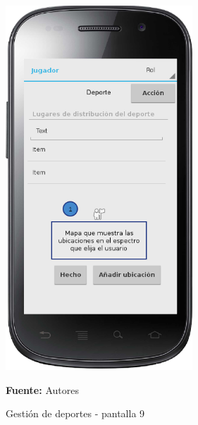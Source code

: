 \begin{figure}[!htb]
  \begin{center}
    \includegraphics[width=7cm]{./imagenes/UI/Deportes/gestion_deportes_9.png}
    \caption{Gestión de deportes - pantalla 9}
    \label{fig:gestion_deportes_9}
    \textbf{Fuente:}  Autores
  \end{center}
\end{figure}

